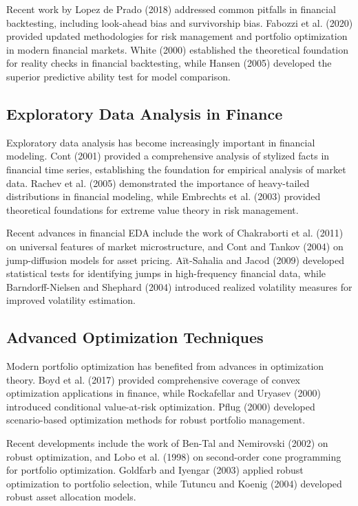 \documentclass[12pt,a4paper]{article}
\begin{document}
Recent work by Lopez de Prado (2018) addressed common pitfalls in financial backtesting, including look-ahead bias and survivorship bias. Fabozzi et al. (2020) provided updated methodologies for risk management and portfolio optimization in modern financial markets. White (2000) established the theoretical foundation for reality checks in financial backtesting, while Hansen (2005) developed the superior predictive ability test for model comparison.

\subsection{Exploratory Data Analysis in Finance}

Exploratory data analysis has become increasingly important in financial modeling. Cont (2001) provided a comprehensive analysis of stylized facts in financial time series, establishing the foundation for empirical analysis of market data. Rachev et al. (2005) demonstrated the importance of heavy-tailed distributions in financial modeling, while Embrechts et al. (2003) provided theoretical foundations for extreme value theory in risk management.

Recent advances in financial EDA include the work of Chakraborti et al. (2011) on universal features of market microstructure, and Cont and Tankov (2004) on jump-diffusion models for asset pricing. Aït-Sahalia and Jacod (2009) developed statistical tests for identifying jumps in high-frequency financial data, while Barndorff-Nielsen and Shephard (2004) introduced realized volatility measures for improved volatility estimation.

\subsection{Advanced Optimization Techniques}

Modern portfolio optimization has benefited from advances in optimization theory. Boyd et al. (2017) provided comprehensive coverage of convex optimization applications in finance, while Rockafellar and Uryasev (2000) introduced conditional value-at-risk optimization. Pflug (2000) developed scenario-based optimization methods for robust portfolio management.

Recent developments include the work of Ben-Tal and Nemirovski (2002) on robust optimization, and Lobo et al. (1998) on second-order cone programming for portfolio optimization. Goldfarb and Iyengar (2003) applied robust optimization to portfolio selection, while Tutuncu and Koenig (2004) developed robust asset allocation models.
\end{document}
